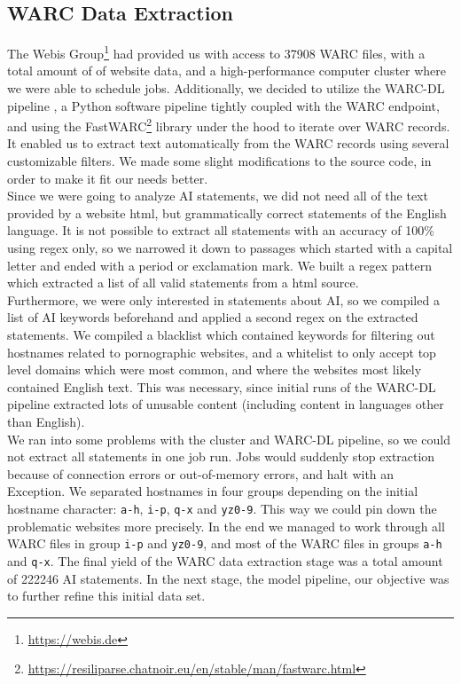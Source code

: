 \subsection{WARC Data Extraction}
The Webis Group\footnote{\url{https://webis.de}} had provided us with access to 37908 WARC files, with a total amount of  of website data, and a high-performance computer cluster where we were able to schedule jobs.
Additionally, we decided to utilize the WARC-DL pipeline \citep{Deckers2022}, a Python software pipeline tightly coupled with the WARC endpoint, and using the FastWARC\footnote{\url{https://resiliparse.chatnoir.eu/en/stable/man/fastwarc.html}} library under the hood to iterate over WARC records.
It enabled us to extract text automatically from the WARC records using several customizable filters.
We made some slight modifications to the source code, in order to make it fit our needs better.
\\
Since we were going to analyze AI statements, we did not need all of the text provided by a website html, but grammatically correct statements of the English language.
It is not possible to extract all statements with an accuracy of 100\% using regex only, so we narrowed it down to passages which started with a capital letter and ended with a period or exclamation mark.
We built a regex pattern which extracted a list of all valid statements from a html source.
\\
Furthermore, we were only interested in statements about AI, so we compiled a list of AI keywords beforehand and applied a second regex on the extracted statements.
We compiled a blacklist which contained keywords for filtering out hostnames related to pornographic websites, and a whitelist to only accept top level domains which were most common, and where the websites most likely contained English text.
This was necessary, since initial runs of the WARC-DL pipeline extracted lots of unusable content (including content in languages other than English).
\\
We ran into some problems with the cluster and WARC-DL pipeline, so we could not extract all statements in one job run.
Jobs would suddenly stop extraction because of connection errors or out-of-memory errors, and halt with an Exception.
We separated hostnames in four groups depending on the initial hostname character: \texttt{a-h}, \texttt{i-p}, \texttt{q-x} and \texttt{yz0-9}.
This way we could pin down the problematic websites more precisely.
In the end we managed to work through all WARC files in group \texttt{i-p} and \texttt{yz0-9}, and most of the WARC files in groups \texttt{a-h} and \texttt{q-x}.
The final yield of the WARC data extraction stage was a total amount of 222246 AI statements.
In the next stage, the model pipeline, our objective was to further refine this initial data set.

